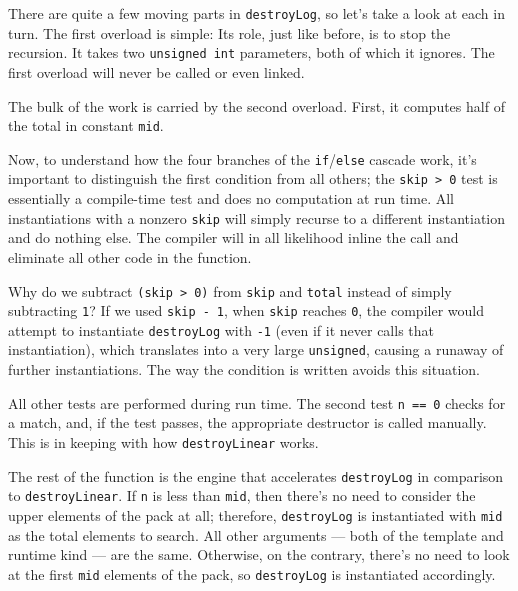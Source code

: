 \noindent There are quite a few moving parts in \lstinline!destroyLog!, so let's take
a look at each in turn. The first overload is simple: Its role, just
like before, is to stop the recursion. It takes two
\lstinline!unsigned!~\lstinline!int! parameters, both of which it ignores. The
first overload will never be called or even linked.

The bulk of the work is carried by the second overload. First, it
computes half of the total in constant \lstinline!mid!.

Now, to understand how the four branches of the
\lstinline!if!/\lstinline!else! cascade work, it's important to distinguish
the first condition from all others; the
\lstinline!skip!~\lstinline!>!~\lstinline!0! test is essentially a compile-time
test and does no computation at run time. All instantiations with a
nonzero \lstinline!skip! will simply recurse to a different instantiation
and do nothing else. The compiler will in all likelihood inline the call
and eliminate all other code in the function.

Why do we subtract \lstinline!(skip!~\lstinline!>!~\lstinline!0)! from
\lstinline!skip! and \lstinline!total! instead of simply subtracting
\lstinline!1!? If we used \lstinline!skip!~\lstinline!-!~\lstinline!1!, when
\lstinline!skip! reaches \lstinline!0!, the compiler would attempt to
instantiate \lstinline!destroyLog! with \lstinline!-1! (even if it never calls
that instantiation), which translates into a very large
\lstinline!unsigned!, causing a runaway of further instantiations. The way
the condition is written avoids this situation.

All other tests are performed during run time. The second test
\lstinline!n!~\lstinline!==!~\lstinline!0! checks for a match, and, if the test
passes, the appropriate destructor is called manually. This is in
keeping with how \lstinline!destroyLinear! works.

The rest of the function is the engine that accelerates
\lstinline!destroyLog! in comparison to\linebreak%
 \lstinline!destroyLinear!. If
\lstinline!n! is less than \lstinline!mid!, then there's no need to consider
the upper elements of the pack at all; therefore, \lstinline!destroyLog! is
instantiated with \lstinline!mid! as the total elements to search. All
other arguments --- both of the template and runtime kind --- are the
same. Otherwise, on the contrary, there's no need to look at the first
\lstinline!mid! elements of the pack, so \lstinline!destroyLog! is
instantiated accordingly.

